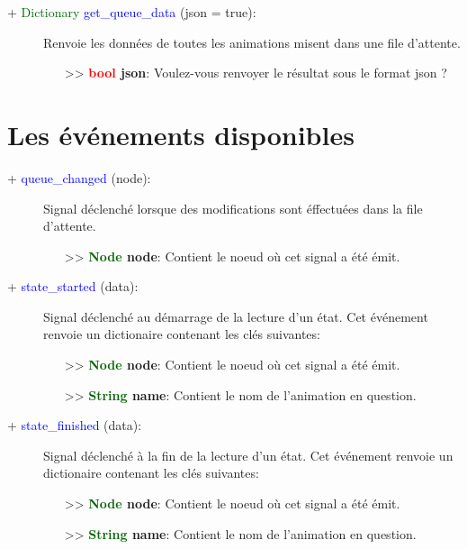 \documentclass[a4paper, 11pt]{article}
\begin{document}
	\begin{description}
		\item [+ \textcolor{darkgreen}{Dictionary} \textcolor{blue}{get\_queue\_data} (json = true):]
		Renvoie les données de toutes les animations misent dans une file d'attente.
		\begin{itemize}
			\item [>> \textbf{\textcolor{red}{bool} json}:] Voulez-vous renvoyer le résultat sous le format 
			json ?
		\end{itemize}
	\end{description}

	\newpage \section{Les événements disponibles}
	\begin{description}
		\item [+ \textcolor{blue}{queue\_changed} (node):] Signal déclenché lorsque des modifications sont
		éffectuées dans la file d'attente.
		\begin{itemize}
			\item [>> \textbf{\textcolor{darkgreen}{Node} node}:] Contient le noeud où cet signal a été 
			émit.\\
		\end{itemize}
	\end{description}
	\begin{description}
		\item [+ \textcolor{blue}{state\_started} (data):] Signal déclenché au démarrage de la lecture d'un 
		état. Cet événement \\renvoie un dictionaire contenant les clés suivantes:
		\begin{itemize}
			\item [>> \textbf{\textcolor{darkgreen}{Node} node}:] Contient le noeud où cet signal a été 
			émit.
			\item [>> \textbf{\textcolor{darkgreen}{String} name}:] Contient le nom de l'animation en 
			question.\\
		\end{itemize}
	\end{description}
	\begin{description}
		\item [+ \textcolor{blue}{state\_finished} (data):] Signal déclenché à la fin de la lecture d'un 
		état. Cet événement renvoie un dictionaire contenant les clés suivantes:
		\begin{itemize}
			\item [>> \textbf{\textcolor{darkgreen}{Node} node}:] Contient le noeud où cet signal a été 
			émit.
			\item [>> \textbf{\textcolor{darkgreen}{String} name}:] Contient le nom de l'animation en 
			question.\\
		\end{itemize}
	\end{description}
\end{document}
